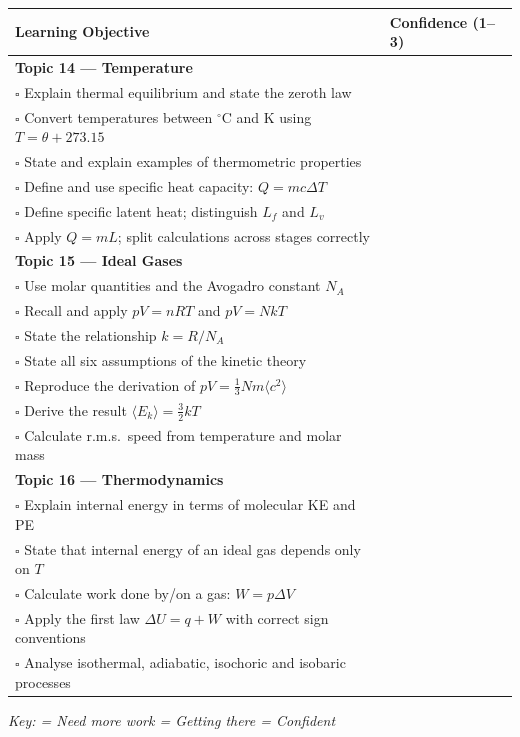 \begin{checklistbox}
\small
\renewcommand{\arraystretch}{1.5}
\begin{tabular}{p{11cm} >{\centering\arraybackslash}p{2.5cm}}
\toprule
\textbf{Learning Objective} & \textbf{Confidence (1--3)} \\
\midrule
\multicolumn{2}{l}{\textbf{Topic 14 — Temperature}} \\
$\square$\; Explain thermal equilibrium and state the zeroth law & \\
$\square$\; Convert temperatures between ${}^{\circ}$C and K using $T = \theta + 273.15$ & \\
$\square$\; State and explain examples of thermometric properties & \\
$\square$\; Define and use specific heat capacity: $Q = mc\Delta T$ & \\
$\square$\; Define specific latent heat; distinguish $L_f$ and $L_v$ & \\
$\square$\; Apply $Q = mL$; split calculations across stages correctly & \\
\midrule
\multicolumn{2}{l}{\textbf{Topic 15 — Ideal Gases}} \\
$\square$\; Use molar quantities and the Avogadro constant $N_A$ & \\
$\square$\; Recall and apply $pV = nRT$ and $pV = NkT$ & \\
$\square$\; State the relationship $k = R/N_A$ & \\
$\square$\; State all six assumptions of the kinetic theory & \\
$\square$\; Reproduce the derivation of $pV = \tfrac{1}{3}Nm\langle c^2\rangle$ & \\
$\square$\; Derive the result $\langle E_k\rangle = \tfrac{3}{2}kT$ & \\
$\square$\; Calculate r.m.s.\ speed from temperature and molar mass & \\
\midrule
\multicolumn{2}{l}{\textbf{Topic 16 — Thermodynamics}} \\
$\square$\; Explain internal energy in terms of molecular KE and PE & \\
$\square$\; State that internal energy of an ideal gas depends only on $T$ & \\
$\square$\; Calculate work done by/on a gas: $W = p\Delta V$ & \\
$\square$\; Apply the first law $\Delta U = q + W$ with correct sign conventions & \\
$\square$\; Analyse isothermal, adiabatic, isochoric and isobaric processes & \\
\bottomrule
\end{tabular}

\medskip
\begin{center}
\textit{Key: = Need more work = Getting there = Confident}
\end{center}
\end{checklistbox}


